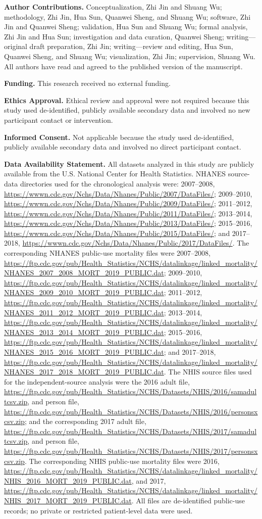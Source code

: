 \documentclass[12pt]{article}
\newcommand{\authorcontributions}[1]{\par\medskip\noindent\textbf{Author Contributions.} #1\par}
\newcommand{\funding}[1]{\par\medskip\noindent\textbf{Funding.} #1\par}
\newcommand{\institutionalreview}[1]{\par\medskip\noindent\textbf{Ethics Approval.} #1\par}
\newcommand{\informedconsent}[1]{\par\medskip\noindent\textbf{Informed Consent.} #1\par}
\newcommand{\dataavailability}[1]{\par\medskip\noindent\textbf{Data Availability Statement.} #1\par}
\begin{document}
\authorcontributions{Conceptualization, Zhi Jin and Shuang Wu; methodology, Zhi Jin, Hua Sun, Quanwei Sheng, and Shuang Wu; software, Zhi Jin and Quanwei Sheng; validation, Hua Sun and Shuang Wu; formal analysis, Zhi Jin and Hua Sun; investigation and data curation, Quanwei Sheng; writing---original draft preparation, Zhi Jin; writing---review and editing, Hua Sun, Quanwei Sheng, and Shuang Wu; visualization, Zhi Jin; supervision, Shuang Wu. All authors have read and agreed to the published version of the manuscript.}
\funding{This research received no external funding.}
\institutionalreview{Ethical review and approval were not required because this study used de-identified, publicly available secondary data and involved no new participant contact or intervention.}
\informedconsent{Not applicable because the study used de-identified, publicly available secondary data and involved no direct participant contact.}
\dataavailability{All datasets analyzed in this study are publicly available from the U.S. National Center for Health Statistics. NHANES source-data directories used for the chronological analysis were: 2007--2008, \url{https://wwwn.cdc.gov/Nchs/Data/Nhanes/Public/2007/DataFiles/}; 2009--2010, \url{https://wwwn.cdc.gov/Nchs/Data/Nhanes/Public/2009/DataFiles/}; 2011--2012, \url{https://wwwn.cdc.gov/Nchs/Data/Nhanes/Public/2011/DataFiles/}; 2013--2014, \url{https://wwwn.cdc.gov/Nchs/Data/Nhanes/Public/2013/DataFiles/}; 2015--2016, \url{https://wwwn.cdc.gov/Nchs/Data/Nhanes/Public/2015/DataFiles/}; and 2017--2018, \url{https://wwwn.cdc.gov/Nchs/Data/Nhanes/Public/2017/DataFiles/}. The corresponding NHANES public-use mortality files were 2007--2008, \url{https://ftp.cdc.gov/pub/Health_Statistics/NCHS/datalinkage/linked_mortality/NHANES_2007_2008_MORT_2019_PUBLIC.dat}; 2009--2010, \url{https://ftp.cdc.gov/pub/Health_Statistics/NCHS/datalinkage/linked_mortality/NHANES_2009_2010_MORT_2019_PUBLIC.dat}; 2011--2012, \url{https://ftp.cdc.gov/pub/Health_Statistics/NCHS/datalinkage/linked_mortality/NHANES_2011_2012_MORT_2019_PUBLIC.dat}; 2013--2014, \url{https://ftp.cdc.gov/pub/Health_Statistics/NCHS/datalinkage/linked_mortality/NHANES_2013_2014_MORT_2019_PUBLIC.dat}; 2015--2016, \url{https://ftp.cdc.gov/pub/Health_Statistics/NCHS/datalinkage/linked_mortality/NHANES_2015_2016_MORT_2019_PUBLIC.dat}; and 2017--2018, \url{https://ftp.cdc.gov/pub/Health_Statistics/NCHS/datalinkage/linked_mortality/NHANES_2017_2018_MORT_2019_PUBLIC.dat}. The NHIS source files used for the independent-source analysis were the 2016 adult file, \url{https://ftp.cdc.gov/pub/Health_Statistics/NCHS/Datasets/NHIS/2016/samadultcsv.zip}, and person file, \url{https://ftp.cdc.gov/pub/Health_Statistics/NCHS/Datasets/NHIS/2016/personsxcsv.zip}; and the corresponding 2017 adult file, \url{https://ftp.cdc.gov/pub/Health_Statistics/NCHS/Datasets/NHIS/2017/samadultcsv.zip}, and person file, \url{https://ftp.cdc.gov/pub/Health_Statistics/NCHS/Datasets/NHIS/2017/personsxcsv.zip}. The corresponding NHIS public-use mortality files were 2016, \url{https://ftp.cdc.gov/pub/Health_Statistics/NCHS/datalinkage/linked_mortality/NHIS_2016_MORT_2019_PUBLIC.dat}, and 2017, \url{https://ftp.cdc.gov/pub/Health_Statistics/NCHS/datalinkage/linked_mortality/NHIS_2017_MORT_2019_PUBLIC.dat}. All files are de-identified public-use records; no private or restricted patient-level data were used.}
\end{document}
